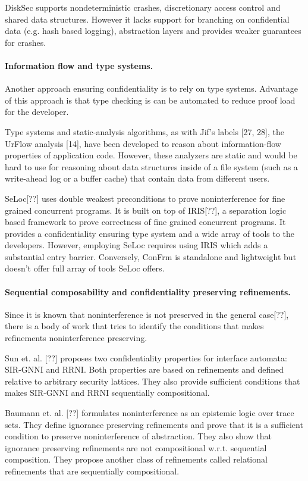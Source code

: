 DiskSec supports nondeterministic crashes, discretionary access control and shared data structures. However it lacks support for branching on confidential data (e.g. hash based logging), abstraction layers and provides weaker guarantees for crashes.

\paragraph{Information flow and type systems.} 
Another approach ensuring confidentiality is to rely on type systems. Advantage of this approach is that type checking is can be automated to reduce proof load for the developer.

Type systems and static-analysis algorithms, as with
Jif’s labels [27, 28], the UrFlow analysis [14], have been
developed to reason about information-flow properties of
application code. However, these analyzers are static and
would be hard to use for reasoning about data structures
inside of a file system (such as a write-ahead log or a
buffer cache) that contain data from different users.

SeLoc[??] uses double weakest preconditions to prove noninterference for fine grained concurrent programs. It is built on top of IRIS[??], a separation logic based framework to prove correctness of fine grained concurrent programs. It provides a confidentiality ensuring type system and a wide array of tools to the developers. However, employing SeLoc requires using IRIS which adds a substantial entry barrier. Conversely, ConFrm is standalone and lightweight but doesn't offer full array of tools SeLoc offers.

\paragraph{Sequential composability and confidentiality preserving refinements.} 
Since it is known that noninterference is not preserved in the general case[??],
there is a body of work that tries to identify the conditions that makes refinements noninterference preserving.
 
Sun et. al. [??] proposes two confidentiality properties for interface automata: SIR-GNNI and RRNI. Both properties are based on refinements and defined relative to arbitrary security lattices. They also provide sufficient conditions that makes SIR-GNNI and RRNI sequentially compositional. 

Baumann et. al. [??] formulates noninterference as an epistemic logic over trace sets. They define ignorance preserving refinements and prove that it is a sufficient condition to preserve noninterference of abstraction. They also show that ignorance preserving refinements are not compositional w.r.t. sequential composition. They propose another class of refinements called relational refinements that are sequentially compositional. 

